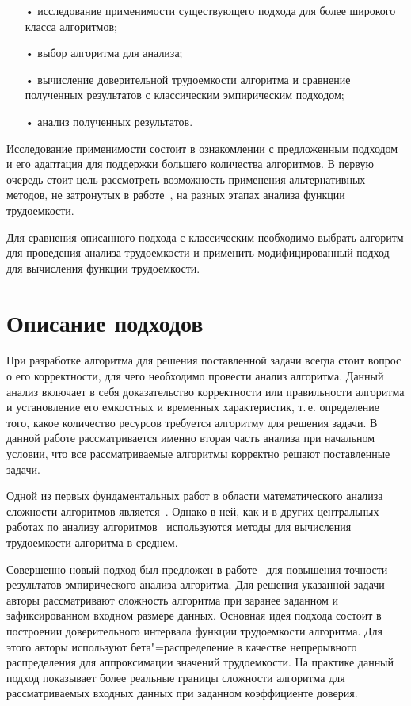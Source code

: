 \documentclass[a4paper, article, 12pt]{extarticle}
\begin{document}
\begin{enumerate}
	\item[•] исследование применимости существующего подхода для более широкого класса алгоритмов;

	\item[•] выбор алгоритма для анализа;

	\item[•] вычисление доверительной трудоемкости алгоритма и сравнение полученных результатов с классическим эмпирическим подходом;

	\item[•] анализ полученных результатов.
\end{enumerate}

Исследование применимости состоит в ознакомлении с предложенным подходом и его адаптация для поддержки большего количества алгоритмов. В первую очередь стоит цель рассмотреть возможность применения альтернативных методов, не затронутых в работе~\cite{petrushyn_ulyanov_analysis}, на разных этапах анализа функции трудоемкости.

Для сравнения описанного подхода с классическим необходимо выбрать алгоритм для проведения анализа трудоемкости и применить модифицированный подход для вычисления функции трудоемкости.

\section{Описание подходов}\label{sec:review}

При разработке алгоритма для решения поставленной задачи всегда стоит вопрос о его корректности, для чего необходимо провести анализ алгоритма. Данный анализ включает в себя доказательство корректности или правильности алгоритма и установление его емкостных и временных характеристик, т.\,е. определение того, какое количество ресурсов требуется алгоритму для решения задачи. В данной работе рассматривается именно вторая часть анализа при начальном условии, что все рассматриваемые алгоритмы корректно решают поставленные задачи.

Одной из первых фундаментальных работ в области математического анализа сложности алгоритмов является~\cite{knuth}. Однако в ней, как и в других центральных работах по анализу алгоритмов~\cite{cormen, wegener} используются методы для вычисления трудоемкости алгоритма в среднем.

Совершенно новый подход был предложен в работе~\cite{petrushyn_ulyanov_analysis} для повышения точности результатов эмпирического анализа алгоритма. Для решения указанной задачи авторы рассматривают сложность алгоритма при заранее заданном и зафиксированном входном размере данных. Основная идея подхода состоит в построении доверительного интервала функции трудоемкости алгоритма. Для этого авторы используют бета"=распределение в качестве непрерывного распределения для аппроксимации значений трудоемкости. На практике данный подход показывает более реальные границы сложности алгоритма для рассматриваемых входных данных при заданном коэффициенте доверия.
\end{document}
